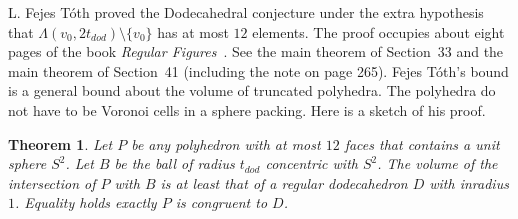 \documentclass{article} %
\newtheorem{theorem}{Theorem}[section]
\begin{document}
L. Fejes T\'oth proved the Dodecahedral conjecture under the extra
hypothesis that $\Lambda(v_0,2t_{dod})\setminus\{v_0\}$ has at most
$12$ elements. The proof occupies about eight pages of the book
\emph{Regular Figures}~\cite{Toth:1964:Regular}. See the main theorem
of Section~33 and the main theorem of Section~41 (including the note
on page 265). Fejes T\'oth's bound is a general bound about the volume
of truncated polyhedra. The polyhedra do not have to be Voronoi cells
in a sphere packing. Here is a sketch of his proof.

\begin{theorem}
  Let $P$ be any polyhedron with at most $12$ faces that contains a
  unit sphere $S^2$. Let $B$ be the ball of radius $t_{dod}$ concentric
  with $S^2$. The volume of the intersection of $P$ with $B$ is at least
  that of a regular dodecahedron $D$ with inradius $1$. Equality holds
  exactly $P$ is congruent to $D$.
\end{theorem}
\end{document}
